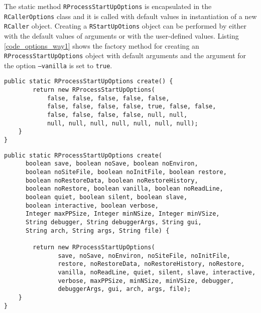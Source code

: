 \documentclass[10pt,a4paper, final, oneside]{article}
\begin{document}
The static method \texttt{RProcessStartUpOptions} is encapsulated in the \texttt{RCallerOptions} class and it is called with default values in instantiation of a new \texttt{RCaller} object. Creating a \texttt{RStartUpOtions} object can be performed by either with the default values of arguments or with the user-defined values. Listing \ref{code_options_way1} shows the factory method for creating an \texttt{RProcessStartUpOptions} object with default arguments and the argument for the option \texttt{--vanilla} is set to \texttt{true}. 

\begin{minipage}{\linewidth}
\begin{lstlisting}[caption=Default RProcessStartUpOptions Creator,label=code_options_way1]
 public static RProcessStartUpOptions create() {
        return new RProcessStartUpOptions(
            false, false, false, false, false,
            false, false, false, false, true, false, false,
            false, false, false, false, null, null,
            null, null, null, null, null, null, null);
    }
}
\end{lstlisting}
\end{minipage}


\begin{minipage}{\linewidth}
\begin{lstlisting}[caption=Custom RProcessStartUpOptions Creator,label=code_options_way2]
public static RProcessStartUpOptions create(
      boolean save, boolean noSave, boolean noEnviron,
      boolean noSiteFile, boolean noInitFile, boolean restore,
      boolean noRestoreData, boolean noRestoreHistory,
      boolean noRestore, boolean vanilla, boolean noReadLine,
      boolean quiet, boolean silent, boolean slave,
      boolean interactive, boolean verbose,
      Integer maxPPSize, Integer minNSize, Integer minVSize,
      String debugger, String debuggerArgs, String gui,
      String arch, String args, String file) {
            
        return new RProcessStartUpOptions(
               save, noSave, noEnviron, noSiteFile, noInitFile, 
               restore, noRestoreData, noRestoreHistory, noRestore, 
               vanilla, noReadLine, quiet, silent, slave, interactive, 
               verbose, maxPPSize, minNSize, minVSize, debugger, 
               debuggerArgs, gui, arch, args, file);
    }
}
\end{lstlisting}
\end{minipage}
\end{document}
